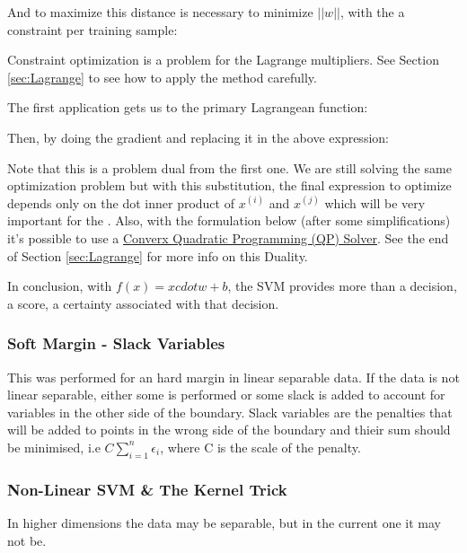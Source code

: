 And to maximize this distance is necessary to minimize $||w||$, with the a constraint per training sample:


Constraint optimization is a problem for the Lagrange multipliers. See Section \ref{sec:Lagrange} to see how to apply the method carefully.

The first application gets us to the primary Lagrangean function:


Then, by doing the gradient and replacing it in the above expression:

Note that this is a problem dual from the first one. We are still solving the same optimization problem but with this substitution, the final expression to optimize depends only on the dot inner product of $x^{(i)}$ and $x^{(j)}$ which will be very important for the . Also, with the formulation below (after some simplifications) it's possible to use a \ul{Converx Quadratic Programming (QP) Solver}. See the end of Section \ref{sec:Lagrange} for more info on this Duality.


In conclusion, with $f(x) = x cdot w + b$, the SVM provides more than a decision, a score, a certainty associated with that decision.

\subsubsection{Soft Margin - Slack Variables}
This was performed for an hard margin in linear separable data. If the data is not linear separable, either some  is performed or some slack is added to account for variables in the other side of the boundary. Slack variables are the penalties that will be added to points in the wrong side of the boundary and thieir sum should be minimised, i.e $C \sum_{i=1}^n \epsilon_i$, where C is the scale of the penalty. 


\subsubsection{Non-Linear SVM \& The Kernel Trick}

In higher dimensions the data may be separable, but in the current one it may not be.

